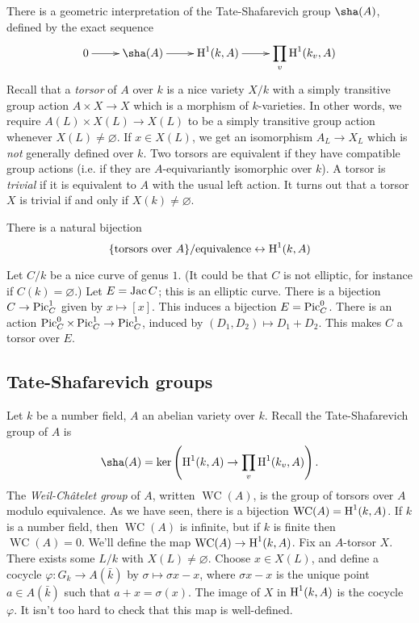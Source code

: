 There is a geometric interpretation of the Tate-Shafarevich group $\sha(A)$, 
defined by the exact sequence 
\[\xymatrix{
  0 \ar[r] 
    & \sha(A) \ar[r] 
    & \h^1(k,A) \ar[r] 
    & \displaystyle\prod_v \h^1(k_v,A)
 }\]
Recall that a \emph{torsor} of $A$ over $k$ is a nice variety $X/k$ with a 
simply transitive group action $A\times X\to X$ which is a morphism of 
$k$-varieties. In other words, we require $A(L)\times X(L)\to X(L)$ to be 
a simply transitive group action whenever $X(L)\ne\varnothing$. If 
$x\in X(L)$, we get an isomorphism $A_L\to X_L$ which is \emph{not} generally 
defined over $k$. Two torsors are equivalent if they have compatible group 
actions (i.e. if they are $A$-equivariantly isomorphic over $k$). A torsor is 
\emph{trivial} if it is equivalent to $A$ with the usual left action. It turns 
out that a torsor $X$ is trivial if and only if $X(k)\ne\varnothing$. 

There is a natural bijection 
\[
  \{\text{torsors over $A$}\}/\text{equivalence} \leftrightarrow \operatorname{H}^1(k,A)
\]

\begin{example}
Let $C/k$ be a nice curve of genus $1$. (It could be that $C$ is not elliptic, 
for instance if $C(k)=\varnothing$.) Let $E=\operatorname{Jac} C$; this is an elliptic curve. 
There is a bijection $C\to \operatorname{Pic}_C^1$ given by $x\mapsto [x]$. This induces a 
bijection $E=\operatorname{Pic}_C^0$. There is an action 
$\operatorname{Pic}_C^0\times \operatorname{Pic}_C^1\to \operatorname{Pic}_C^1$, induced by $(D_1,D_2)\mapsto D_1+D_2$. 
This makes $C$ a torsor over $E$. 
\end{example}










\subsection{Tate-Shafarevich groups}

Let $k$ be a number field, $A$ an abelian variety over $k$. Recall the 
Tate-Shafarevich group of $A$ is 
\[
  \sha(A) = \ker\left(\h^1(k,A) \to \prod_v \h^1(k_v,A)\right) \text{.}
\]
The \emph{Weil-Ch\^atelet group} of $A$, written $\operatorname{WC}(A)$, is 
the group of torsors over $A$ modulo equivalence. As we have seen, there is a 
bijection $\operatorname{WC}(A) = \operatorname{H}^1(k,A)$. If $k$ is a number field, then 
$\operatorname{WC}(A)$ is infinite, but if $k$ is finite then 
$\operatorname{WC}(A)=0$. We'll define the map 
$\operatorname{WC}(A)\to \operatorname{H}^1(k,A)$. Fix an $A$-torsor $X$. There exists some 
$L/k$ with $X(L)\ne\varnothing$. Choose $x\in X(L)$, and define a cocycle 
$\varphi:G_k\to A(\bar k)$ by $\sigma\mapsto \sigma x - x$, where 
$\sigma x- x$ is the unique point $a\in A(\bar k)$ such that $a+x=\sigma(x)$. 
The image of $X$ in $\operatorname{H}^1(k,A)$ is the cocycle $\varphi$. It isn't too hard to 
check that this map is well-defined. 

